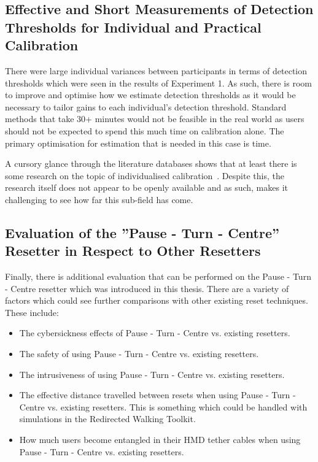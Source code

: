 \subsection{Effective and Short Measurements of Detection Thresholds for Individual and Practical Calibration}   
There were large individual variances between participants in terms of detection thresholds which were seen in the results of Experiment 1. As such, there is room to improve and optimise how we estimate detection thresholds as it would be necessary to tailor gains to each individual's detection threshold. Standard methods that take 30+ minutes would not be feasible in the real world as users should not be expected to spend this much time on calibration alone. The primary optimisation for estimation that is needed in this case is time. 

A cursory glance through the literature databases shows that at least there is some research on the topic of individualised calibration~\cite{hutton2018individualized}. Despite this, the research itself does not appear to be openly available and as such, makes it challenging to see how far this sub-field has come. 

\subsection{Evaluation of the ''Pause - Turn - Centre'' Resetter in Respect to Other Resetters}
Finally, there is additional evaluation that can be performed on the Pause - Turn - Centre resetter which was introduced in this thesis. There are a variety of factors which could see further comparisons with other existing reset techniques. These include:

\begin{itemize}
    \item The cybersickness effects of Pause - Turn - Centre vs. existing resetters.
    \item The safety of using Pause - Turn - Centre vs. existing resetters.
    \item The intrusiveness of using Pause - Turn - Centre vs. existing resetters.
    \item The effective distance travelled between resets when using Pause - Turn - Centre vs. existing resetters. This is something which could be handled with simulations in the Redirected Walking Toolkit. 
    \item How much users become entangled in their HMD tether cables when using Pause - Turn - Centre vs. existing resetters.
\end{itemize}
      
\iffalse
   * Having people's first experience with VR be with redirected walking
      * They might normalise the redirected walking elements
         * \todo{Will have to look deeper into the data on people with no experience and how many detections they did}

\subsection{Distractor Salience and Optical Flow}
* How does salience impact optical flow? How does this then impact the noticeability of redirection?
* Already covered by other sections I'd say
\fi